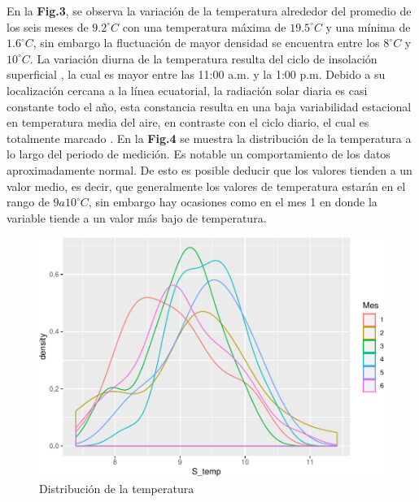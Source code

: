 \documentclass[conference,final,]{IEEEtran}
\makeatletter
\def\maxwidth{\ifdim\Gin@nat@width>\linewidth\linewidth
\else\Gin@nat@width\fi}
\let\Oldincludegraphics\includegraphics
\renewcommand{\includegraphics}[1]{\Oldincludegraphics[width=\maxwidth]{#1}}
\makeatother
\begin{document}
En la \textbf{Fig.3}, se observa la variación de la temperatura
alrededor del promedio de los seis meses de \(9.2^{\circ}C\) con una
temperatura máxima de \(19.5^{\circ}C\) y una mínima de
\(1.6^{\circ}C\), sin embargo la fluctuación de mayor densidad se
encuentra entre los \(8^{\circ}C\) y \(10^{\circ}C\). La variación
diurna de la temperatura resulta del ciclo de insolación superficial
\cite{poveda2004hidroclimatologia,}, la cual es mayor entre las 11:00
a.m. y la 1:00 p.m. Debido a su localización cercana a la línea
ecuatorial, la radiación solar diaria es casi constante todo el año,
esta constancia resulta en una baja variabilidad estacional en
temperatura media del aire, en contraste con el ciclo diario, el cual es
totalmente marcado \cite{buytaert2006hidrologia,}. En la \textbf{Fig.4}
se muestra la distribución de la temperatura a lo largo del periodo de
medición. Es notable un comportamiento de los datos aproximadamente
normal. De esto es posible deducir que los valores tienden a un valor
medio, es decir, que generalmente los valores de temperatura estarán en
el rango de \(9 a 10^{\circ}C\), sin embargo hay ocasiones como en el
mes 1 en donde la variable tiende a un valor más bajo de temperatura.

\begin{figure}
\centering
\includegraphics{Hidrology_files/figure-latex/unnamed-chunk-5-1.pdf}
\caption{Distribución de la temperatura}
\end{figure}
\end{document}
